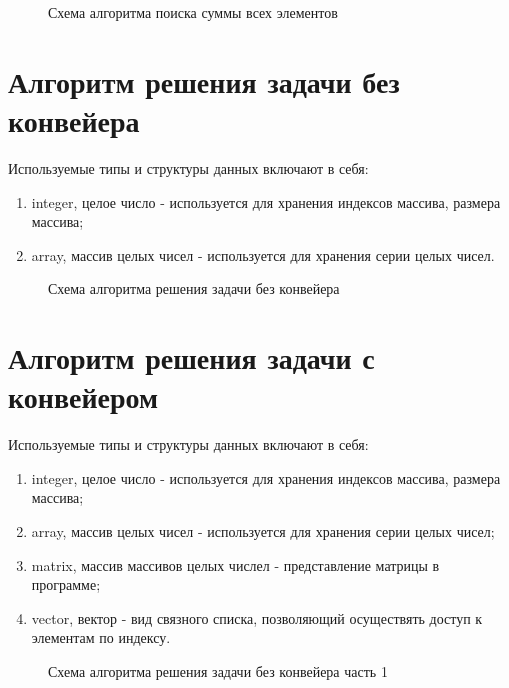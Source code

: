\newpage

\begin{figure}[ph!]
	\caption{Схема алгоритма поиска суммы всех элементов}
\end{figure}

\section{Алгоритм решения задачи без конвейера}

Используемые типы и структуры данных включают в себя:
\begin{enumerate}
	\item integer, целое число - используется для хранения индексов массива, размера массива;
	\item array, массив целых чисел - используется для хранения серии целых чисел.
\end{enumerate}

\newpage

\begin{figure}[ph!]
	\caption{Схема алгоритма решения задачи без конвейера}
\end{figure}

\section{Алгоритм решения задачи с конвейером}

Используемые типы и структуры данных включают в себя:
\begin{enumerate}
	\item integer, целое число - используется для хранения индексов массива, размера массива;
	\item array, массив целых чисел - используется для хранения серии целых чисел;
	\item matrix, массив массивов целых числел - представление матрицы в программе;
	\item vector, вектор - вид связного списка, позволяющий осуществять доступ к элементам по индексу.
\end{enumerate}

\newpage

\begin{figure}[ph!]
	\caption{Схема алгоритма решения задачи без конвейера часть 1}
\end{figure}

